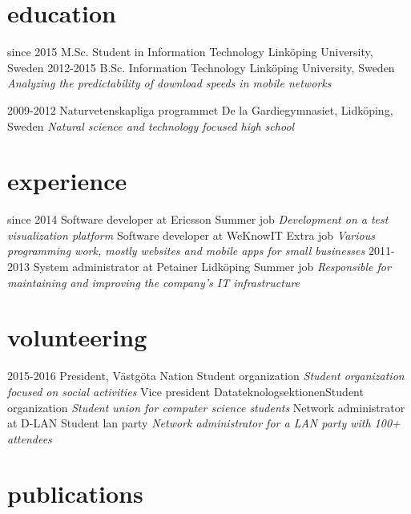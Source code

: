 \documentclass[]{friggeri-cv}
\begin{document}
\section{education}

\begin{entrylist}
  \entry
    {since 2015}
    {M.Sc. Student in Information Technology}
    {Linköping University, Sweden}
    {}
  \entry
    {2012-2015}
    {B.Sc. Information Technology}
    {Linköping University, Sweden}
    {\emph{Analyzing the predictability of download speeds in mobile networks}}

  \entry
    {2009-2012}
    {Naturvetenskapliga programmet}
    {De la Gardiegymnasiet, Lidköping, Sweden}
    {\emph{Natural science and technology focused high school}}
\end{entrylist}

\section{experience}
\begin{entrylist}
  \entry
  {since 2014}
  {Software developer at Ericsson}
  {Summer job}
  {\emph{Development on a test visualization platform}}
  {Software developer at WeKnowIT}
  {Extra job}
  {\emph{Various programming work, mostly websites and mobile apps for small
  businesses}}
  \entry
  {2011-2013}
  {System administrator at Petainer Lidköping}
  {Summer job}
  {\emph{Responsible for maintaining and improving the company's IT infrastructure}}
 

\end{entrylist}
\section{volunteering}
\begin{entrylist}
\entry
    {2015-2016}
    {President, Västgöta Nation}
    {Student organization}
    {\emph{Student organization focused on social activities}}
  {Vice president Datateknologsektionen}{Student organization}
  {\emph{Student union for computer science students}}
  {Network administrator at D-LAN}
  {Student lan party}
  {\emph{Network administrator for a LAN party with 100+ attendees}}
\end{entrylist}
	\section{publications}
\end{document}
